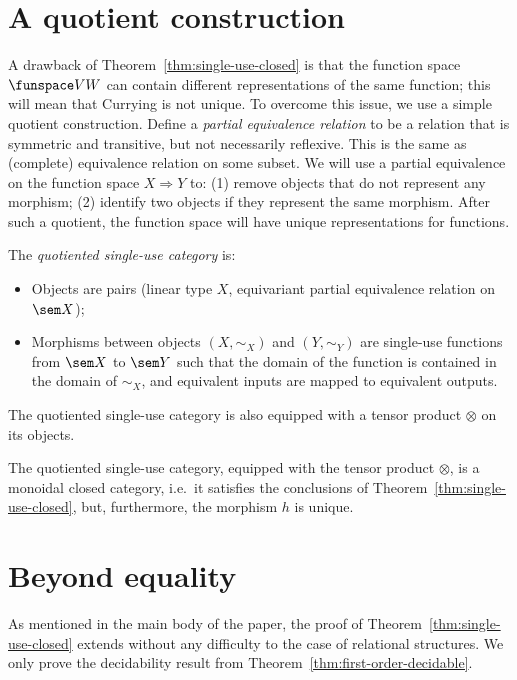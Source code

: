\section{A quotient construction}
\label{sec:quotient-category}
A drawback of Theorem~\ref{thm:single-use-closed} is that the function space $\funspace V W$ can contain different representations of the same function; this will mean that Currying is not unique. To overcome this issue, we use a simple quotient construction. 
Define a \emph{partial equivalence relation} to be a relation that is symmetric and transitive, but not necessarily reflexive.  This is the same as (complete) equivalence relation on some subset. We will use a partial equivalence on the function space $X \Rightarrow Y$ to: (1)
 remove objects that do not represent any morphism; (2) identify two objects if they represent the same morphism. After such a quotient, the function space will have unique representations for functions. 




\begin{definition}
    The \emph{quotiented single-use category} is: 
    \begin{itemize}
    \item Objects are pairs (linear type $X$, equivariant partial equivalence relation on $\sem X$);
    \item Morphisms between objects $(X,\sim_X)$ and $(Y,\sim_Y)$ are single-use functions from $\sem X$ to $\sem Y$ such that the domain of the function is contained in the domain of $\sim_X$, and equivalent inputs are mapped to equivalent outputs.
    \end{itemize}
\end{definition}

The quotiented single-use category is also equipped with a tensor product $\otimes$ on its objects.
\begin{theorem}
    The quotiented single-use category, equipped with the tensor product $\otimes$, is a monoidal closed category, i.e.~it satisfies the conclusions of Theorem~\ref{thm:single-use-closed}, but, furthermore, the morphism $h$ is unique.
\end{theorem}

\section{Beyond equality}
\label{sec:beyond-equality-appendix}

As mentioned in the main body of the paper, the proof of Theorem~\ref{thm:single-use-closed} extends without any difficulty to the case of relational structures. We only prove the decidability result from Theorem~\ref{thm:first-order-decidable}.


